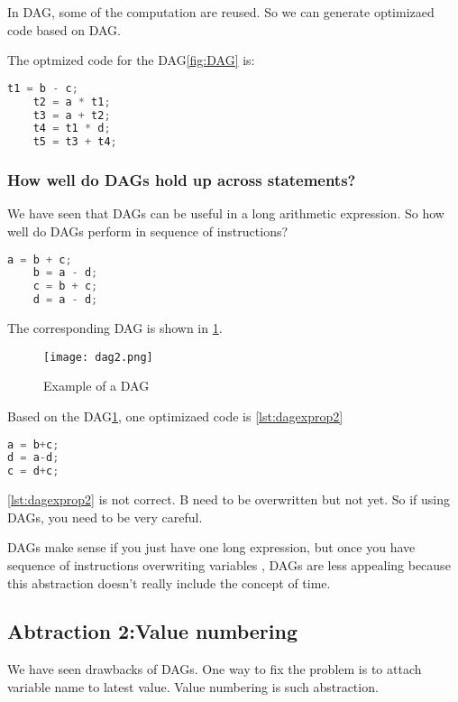 In DAG, some of the computation are reused. So we can generate optimizaed code based on DAG.

The optmized code for the DAG\ref{fig:DAG} is: 

\begin{lstlisting}[language=C, caption=code ,label=lst:dag]
    t1 = b - c;
    t2 = a * t1;
    t3 = a + t2;
    t4 = t1 * d;
    t5 = t3 + t4;
\end{lstlisting}


\subsubsection{How well do DAGs hold up across statements?}

We have seen that DAGs can be useful in a long arithmetic expression. So how well do DAGs
perform in sequence of instructions?

\begin{lstlisting}[language=C, caption=code ,label=lst:dagexpr2]
    a = b + c;
    b = a - d;
    c = b + c;
    d = a - d;
\end{lstlisting}


The corresponding DAG is shown in \ref{fig:DAG2}.
\begin{figure}[h]
    \centering
    \texttt{[image: dag2.png]}
    \caption{Example of a DAG}
    \label{fig:DAG2}
\end{figure}

Based on the DAG\ref{fig:DAG2}, one optimizaed code is \ref{lst:dagexprop2}


\begin{lstlisting}[language=C, caption=code ,label=lst:dagexprop2]
a = b+c;
d = a-d;
c = d+c;
\end{lstlisting}

\ref{lst:dagexprop2} is not correct. B need to be overwritten but not yet. So if using DAGs, you need to be 
very careful. 

DAGs make sense if you just have one long expression, but once you have sequence of instructions overwriting variables
, DAGs are less appealing because this abstraction doesn't really include the concept of time.




\subsection{Abtraction 2:Value numbering} 

We have seen drawbacks of DAGs. One way to fix the problem is to attach variable name to latest value. Value numbering is 
such abstraction.

